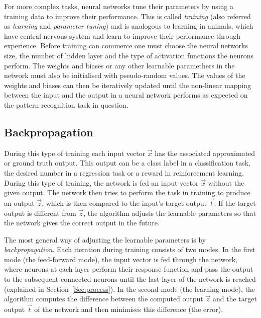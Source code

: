 For more complex tasks, neural networks tune their parameters by using a training data to improve their performance. This is called \textit{training} (also referred as \textit{learning} and \textit{parameter tuning}) and is analogous to learning in animals, which have central nervous system and learn to improve their performance through experience. Before training can commerce one must choose the neural networks size, the number of hidden layer and the type of activation functions the neurons perform. The weights and biases or any other learnable paramethers in the network must also be initialised with pseudo-random values. The values of the weights and biases can then be iteratively updated until the non-linear mapping between the input and the output in a neural network performs as expected on the pattern recognition task in question. 





\subsection{Backpropagation}
\label{sec:backprop}
During this type of training each input vector $\vec{x}$ has the associated approximated or ground truth output. This output can be a class label in a classification task, the desired number in a regression task or a reward in reinforcement learning. During this type of training, the network is fed an input vector $\vec{x}$ without the given output. The network then tries to perform the task in training to produce an output $\vec{z}$, which is then compared to the input's target output $\vec{t}$. If the target output is different from $\vec{z}$, the algorithm adjusts the learnable parameters so that the network gives the correct output in the future. 

The most general way of adjusting the learnable parameters is by \textit{backpropagation}. Each iteration during training consists of two modes. In the first mode (the feed-forward mode), the input vector is fed through the network, where neurons at each layer perform their response function and pass the output to the subsequent connected neurons until the last layer of the network is reached (explained in Section~\ref{Sec:process}). In the second mode (the learning mode), the algorithm computes the difference between the computed output $\vec{z}$ and the target output $\vec{t}$ of the network and then minimises this difference (the error). 

